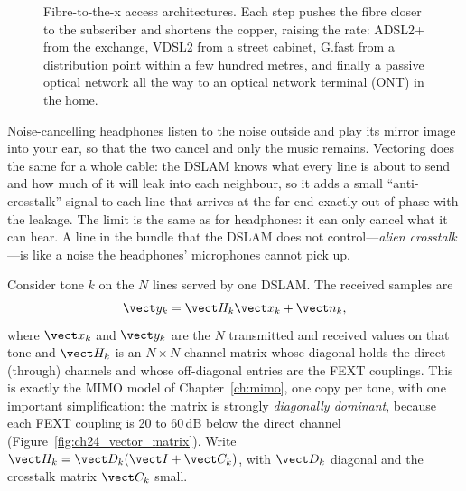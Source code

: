 \begin{figure}[htbp]
\caption{Fibre-to-the-x access architectures. Each step pushes the fibre closer to the subscriber and
shortens the copper, raising the rate: ADSL2+ from the exchange, VDSL2 from a street cabinet, G.fast
from a distribution point within a few hundred metres, and finally a passive optical network all the
way to an optical network terminal (ONT) in the home.}
\label{fig:ch24_fttx}
\end{figure}

\begin{analogy}
Noise-cancelling headphones listen to the noise outside and play its mirror image into your ear, so
that the two cancel and only the music remains. Vectoring does the same for a whole cable: the
DSLAM knows what every line is about to send and how much of it will leak into each neighbour, so
it adds a small ``anti-crosstalk'' signal to each line that arrives at the far end exactly out of
phase with the leakage. The limit is the same as for headphones: it can only cancel what it can
hear. A line in the bundle that the DSLAM does not control---\emph{alien crosstalk}---is like a
noise the headphones' microphones cannot pick up.
\end{analogy}

Consider tone $k$ on the $N$ lines served by one DSLAM. The received samples are
\begin{equation}
\vect y_k=\vect H_k\vect x_k+\vect n_k,
\label{eq:ch24:vectmodel}
\end{equation}
where $\vect x_k$ and $\vect y_k$ are the $N$ transmitted and received values on that tone and
$\vect H_k$ is an $N\times N$ channel matrix whose diagonal holds the direct (through) channels and
whose off-diagonal entries are the FEXT couplings. This is exactly the MIMO model of
Chapter~\ref{ch:mimo}, one copy per tone, with one important simplification: the matrix is strongly
\emph{diagonally dominant}, because each FEXT coupling is 20 to 60\,dB below the direct channel
(Figure~\ref{fig:ch24_vector_matrix}). Write $\vect H_k=\vect D_k(\vect I+\vect C_k)$, with
$\vect D_k$ diagonal and the crosstalk matrix $\vect C_k$ small.


